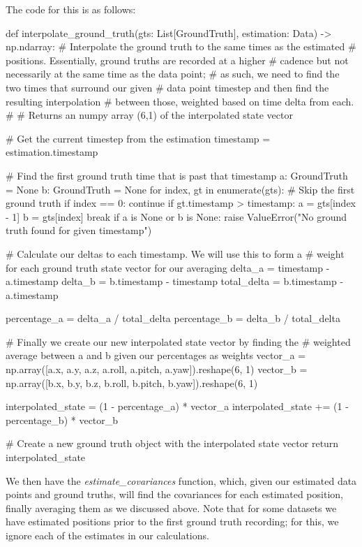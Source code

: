 \documentclass{article}
\begin{document}
The code for this is as follows:

\begin{python}
    def interpolate_ground_truth(gts: List[GroundTruth], estimation: Data) -> np.ndarray:
    # Interpolate the ground truth to the same times as the estimated
    # positions. Essentially, ground truths are recorded at a higher
    # cadence but not necessarily at the same time as the data point;
    # as such, we need to find the two times that surround our given
    # data point timestep and then find the resulting interpolation
    # between those, weighted based on time delta from each.
    #
    # Returns an numpy array (6,1) of the interpolated state vector

    # Get the current timestep from the estimation
    timestamp = estimation.timestamp

    # Find the first ground truth time that is past that timestamp
    a: GroundTruth = None
    b: GroundTruth = None
    for index, gt in enumerate(gts):
    # Skip the first ground truth
    if index == 0:
    continue
    if gt.timestamp > timestamp:
    a = gts[index - 1]
    b = gts[index]
    break
    if a is None or b is None:
    raise ValueError("No ground truth found for given timestamp")

    # Calculate our deltas to each timestamp. We will use this to form a
    # weight for each ground truth state vector for our averaging
    delta_a = timestamp - a.timestamp
    delta_b = b.timestamp - timestamp
    total_delta = b.timestamp - a.timestamp

    percentage_a = delta_a / total_delta
    percentage_b = delta_b / total_delta

    # Finally we create our new interpolated state vector by finding the
    # weighted average between a and b given our percentages as weights
    vector_a = np.array([a.x, a.y, a.z, a.roll, a.pitch, a.yaw]).reshape(6, 1)
    vector_b = np.array([b.x, b.y, b.z, b.roll, b.pitch, b.yaw]).reshape(6, 1)

    interpolated_state = (1 - percentage_a) * vector_a
    interpolated_state += (1 - percentage_b) * vector_b

    # Create a new ground truth object with the interpolated state vector
    return interpolated_state
\end{python}

We then have the \textit{estimate\_covariances} function, which, given our estimated data points and ground truths, will find the covariances for each estimated position, finally averaging them as we discussed above. Note that for some datasets we have estimated positions prior to the first ground truth recording; for this, we ignore each of the estimates in our calculations.
\end{document}
